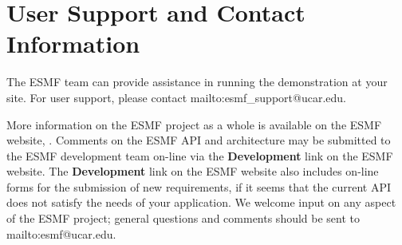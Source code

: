 \section{User Support and Contact Information}

The ESMF team can provide assistance in running the demonstration 
at your site.  For user support, please contact 
{mailto:esmf_support@ucar.edu}.  

More information on the ESMF project as a whole is available on the 
ESMF website, .  
Comments on the ESMF API and architecture may be submitted to the ESMF development 
team on-line via the {\bf Development} link on the ESMF website.  The {\bf Development} 
link on the ESMF website also includes on-line forms for the submission of 
new requirements, if it seems that the current API does not satisfy the needs of 
your application.  We welcome input on any aspect of the ESMF project; general
questions and comments should be sent to 
{mailto:esmf@ucar.edu}.




